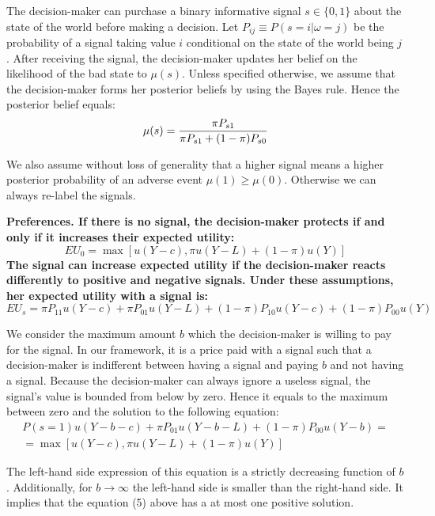 \documentclass[12pt,a4paper]{article}
\begin{document}
The decision-maker can purchase a binary informative signal $s\in\{0,1\}$ about the state of the world before making a decision. Let $P_{ij}\equiv P(s=i|\omega=j)$ be the probability of a signal taking value $i$ conditional on the state of the world being $j$.  After receiving the signal, the decision-maker updates her belief on the likelihood of the bad state to $\mu(s)$. Unless specified otherwise, we assume that the decision-maker forms her posterior beliefs by using the Bayes rule. Hence the posterior belief equals:
\begin{equation}
\mu(s)= {\pi P_{s1} \over \pi P_{s1}+(1-\pi)P_{s0}}
\end{equation}

We also assume without loss of generality that a higher signal means a higher posterior probability of an adverse event $\mu(1)\geq\mu(0)$. Otherwise we can always re-label the signals.

\vspace{10pt}
\bf Preferences. \rm If there is no signal, the decision-maker protects if and only if it increases their expected utility:
\begin{equation}
EU_0=\max[u(Y-c),\pi u(Y-L)+(1-\pi) u(Y)]
\end{equation}
The signal can increase expected utility if the decision-maker reacts differently to positive and negative signals. Under these assumptions, her expected utility with a signal is:
\begin{equation}
EU_s=\pi P_{11}u(Y-c)+\pi P_{01}u(Y-L)+(1-\pi)P_{10}u(Y-c)+(1-\pi)P_{00}u(Y)
\end{equation}

We consider the maximum amount $b$ which the decision-maker is willing to pay for the signal. In our framework, it is a price paid with a signal such that a decision-maker is indifferent between having a signal and paying $b$ and not having a signal. Because the decision-maker can always ignore a useless signal, the signal's value is bounded from below by zero. Hence it equals to the maximum between zero and the solution to the following equation:
\begin{equation}
\begin{split}
P(s=1)u(Y-b-c)+\pi P_{01}u(Y-b-L)+(1-\pi)P_{00}u(Y-b)=\\=\max[u(Y-c),\pi u(Y-L)+(1-\pi) u(Y)] 
\end{split}
\end{equation}

The left-hand side expression of this equation is a strictly decreasing function of $b$. Additionally, for $b\rightarrow \infty$ the left-hand side is smaller than the right-hand side. It implies that the equation (5) above has a at most one positive solution.
\end{document}
